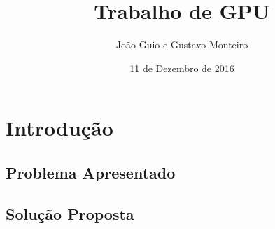 \documentclass{main}
\title{Trabalho de GPU}
\author{João Guio e Gustavo Monteiro}
\date{11 de Dezembro de 2016}
\begin{document}
\maketitle

\vspace{1em}

\newpage

\tableofcontents

\newpage

\section{Introdução}
\subsection{Problema Apresentado}


\subsection{Solução Proposta}
\end{document}
